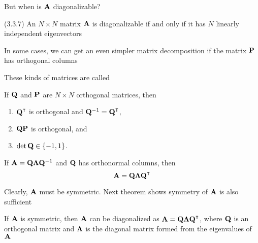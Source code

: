 \begin{frame}
    
    \vspace{2em}
    But when is $\mathbf A$ diagonalizable?  
    
    \vspace{.7em}
    \Fact (3.3.7)
    An $N \times N$ matrix $\mathbf A$ is diagonalizable if and only if
    it has $N$ linearly independent eigenvectors

\end{frame}


\begin{frame}

     \vspace{2em}
    In some cases, we can get an even simpler matrix decomposition if 
    the matrix $\mathbf P$ has orthogonal columns 

    These kinds of matrices are called 
    
    \vspace{.7em}
    \Fact{\eqref{ET-fa:orthmat}}
    If $\mathbf Q$ and $\mathbf P$ are $N \times N$ orthogonal matrices, then
    \begin{enumerate}
        \item $\boldQ^\T$ is orthogonal and $\boldQ^{-1} = \boldQ^\T$,
        \item $\mathbf Q \mathbf P$ is orthogonal, and
        \item $\det \mathbf Q \in \{-1, 1\}$.
    \end{enumerate}
    
\end{frame}
    
\begin{frame}

    \vspace{2em}
    If $\mathbf A = \mathbf Q {\boldsymbol \Lambda} \mathbf Q^{-1}$ and $\mathbf Q$ has orthonormal columns,
    then $$\boldA = \boldQ \boldLambda \boldQ^\T$$
    
    Clearly, $\mathbf A$ must be symmetric. Next theorem shows symmetry of $\mathbf A$ is also sufficient
    
    \vspace{.7em}
    \Thm{\eqref{ET-t:dismat}}
    If $\mathbf A$ is symmetric, then $\mathbf A$ can be
    diagonalized as $\boldA = \boldQ \boldLambda \boldQ^\T$, where 
    $\mathbf Q$ is an orthogonal matrix and ${\boldsymbol \Lambda}$ is the 
    diagonal matrix formed from the eigenvalues of $\mathbf A$
    
\end{frame}

